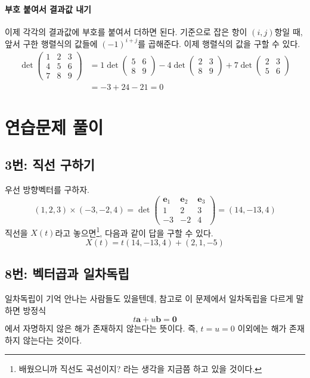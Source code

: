 \documentclass{scrartcl}
\begin{document}
\paragraph{부호 붙여서 결과값 내기} 이제 각각의 결과값에 부호를 붙여서 더하면 된다. 기준으로 잡은 항이 $(i, j)$항일 때, 앞서 구한 행렬식의 값들에 $(-1)^{i+j}$를 곱해준다. 이제 행렬식의 값을 구할 수 있다.
\begin{align*}
\det\begin{pmatrix}
1 & 2 & 3\\
4 & 5 & 6\\
7 & 8 & 9
\end{pmatrix}&=1\det\begin{pmatrix}
5 & 6\\
8 & 9
\end{pmatrix}-4\det\begin{pmatrix}
2 & 3\\
8 & 9
\end{pmatrix}+7\det\begin{pmatrix}
2 & 3\\
5 & 6
\end{pmatrix}\\
&=-3+24-21=0
\end{align*}

\section{연습문제 풀이}
\subsection{3번: 직선 구하기}
우선 방향벡터를 구하자.
\[(1,2,3)\times(-3,-2,4)=\det\begin{pmatrix}\mathbf{e}_1 & \mathbf{e}_2 & \mathbf{e}_3\\
1 & 2 & 3 \\
-3 & -2 & 4
\end{pmatrix}=(14,-13,4)
\]
직선을 \(X(t)\)라고 놓으면\footnote{배웠으니까 직선도 곡선이지? 라는 생각을 지금쯤 하고 있을 것이다.}, 다음과 같이 답을 구할 수 있다.
\[X(t)=t(14,-13,4)+(2,1,-5)\]

\subsection{8번: 벡터곱과 일차독립}
일차독립이 기억 안나는 사람들도 있을텐데, 참고로 이 문제에서 일차독립을 다르게 말하면 방정식
\[t\mathbf{a}+u\mathbf{b}=\mathbf{0}\]
에서 자명하지 않은 해가 존재하지 않는다는 뜻이다. 즉, \(t=u=0\) 이외에는 해가 존재하지 않는다는 것이다.
\end{document}
